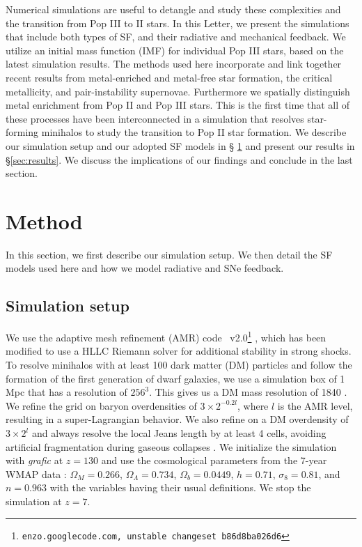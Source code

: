\documentclass[apjl]{emulateapj}
\begin{document}
Numerical simulations are useful to detangle and study these
complexities and the transition from Pop III to II stars.  In this
Letter, we present the simulations that include both types of SF, and
their radiative and mechanical feedback.  We utilize an initial mass
function (IMF) for individual Pop III stars, based on the latest
simulation results.  The methods used here incorporate and link
together recent results from metal-enriched and metal-free star
formation, the critical metallicity, and pair-instability supernovae.
Furthermore we spatially distinguish metal enrichment from Pop II and
Pop III stars.  This is the first time that all of these processes
have been interconnected in a simulation that resolves star-forming
minihalos to study the transition to Pop II star formation.  We
describe our simulation setup and our adopted SF models in \S
\ref{sec:setup} and present our results in \S \ref{sec:results}.  We
discuss the implications of our findings and conclude in the last
section.

\section{Method}
\label{sec:setup}

In this section, we first describe our simulation setup.  We then
detail the SF models used here and how we model radiative and SNe
feedback.

\subsection{Simulation setup}

We use the adaptive mesh refinement (AMR) code
\enzo~v2.0\footnote[\dag]{\texttt{enzo.googlecode.com, unstable
    changeset b86d8ba026d6}} \citep{BryanNorman1997, OShea2004}, which
has been modified to use a HLLC Riemann solver \citep{Toro94_HLLC} for
additional stability in strong shocks.  To resolve minihalos with at
least 100 dark matter (DM) particles and follow the formation of the
first generation of dwarf galaxies, we use a simulation box of 1 Mpc
that has a resolution of $256^3$.  This gives us a DM mass resolution
of 1840 \Ms.  We refine the grid on baryon overdensities of $3 \times
2^{-0.2l}$, where $l$ is the AMR level, resulting in a
super-Lagrangian behavior.  We also refine on a DM overdensity of $3
\times 2^l$ and always resolve the local Jeans length by at least 4
cells, avoiding artificial fragmentation during gaseous collapses
\citep{Truelove97}.  We initialize the simulation with \textsl{grafic}
\citep{Bertschinger01} at $z = 130$ and use the cosmological
parameters from the 7-year WMAP data \citep{WMAP7}: $\Omega_M =
0.266$, $\Omega_\Lambda = 0.734$, $\Omega_b = 0.0449$, $h = 0.71$,
$\sigma_8 = 0.81$, and $n = 0.963$ with the variables having their
usual definitions.  We stop the simulation at $z=7$.
\end{document}
